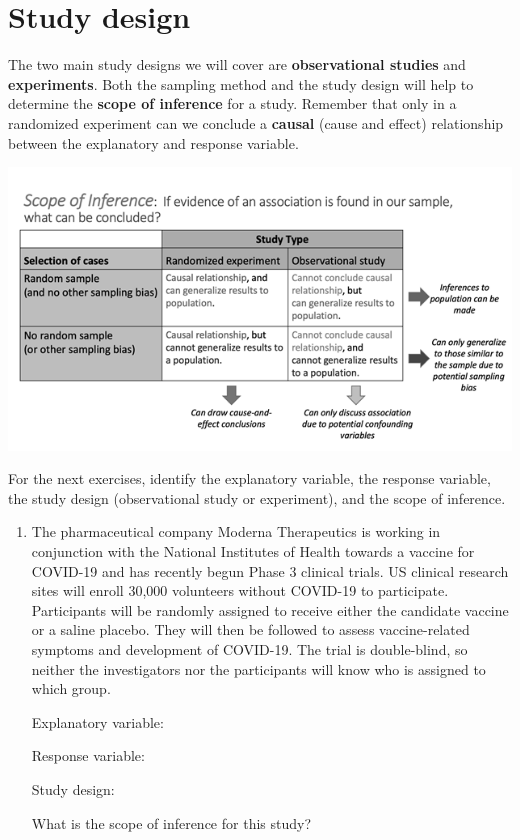 \documentclass[
]{report}
\begin{document}
\newpage

\hypertarget{study-design-1}{%
\section{Study design}\label{study-design-1}}

The two main study designs we will cover are \textbf{observational studies} and \textbf{experiments}. Both the sampling method and the study design will help to determine the \textbf{scope of inference} for a study. Remember that only in a randomized experiment can we conclude a \textbf{causal} (cause and effect) relationship between the explanatory and response variable.

\begin{center}\includegraphics[width=0.75\linewidth]{images/ScopeOfInferenceGreyscale} \end{center}

For the next exercises, identify the explanatory variable, the response variable, the study design (observational study or experiment), and the scope of inference.

\begin{enumerate}
\def\labelenumi{\arabic{enumi}.}
\setcounter{enumi}{5}
\item
  The pharmaceutical company Moderna Therapeutics is working in conjunction with the National Institutes of Health towards a vaccine for COVID-19 and has recently begun Phase 3 clinical trials. US clinical research sites will enroll 30,000 volunteers without COVID-19 to participate. Participants will be randomly assigned to receive either the candidate vaccine or a saline placebo. They will then be followed to assess vaccine-related symptoms and development of COVID-19. The trial is double-blind, so neither the investigators nor the participants will know who is assigned to which group.
  \vspace{0.1in}

  Explanatory variable:
  \vspace{0.25in}

  Response variable:
  \vspace{0.25in}

  Study design:
  \vspace{0.25in}

  What is the scope of inference for this study?
  \vspace{0.5in}
\end{enumerate}
\end{document}
